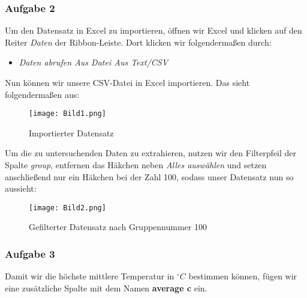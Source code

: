 \documentclass[a4paper, 12pt]{article}
\begin{document}
\subsubsection{Aufgabe 2}
Um den Datensatz in Excel zu importieren, öffnen wir Excel und klicken 
auf den Reiter \textit{Daten} der Ribbon-Leiste. Dort klicken wir folgendermaßen 
durch:

\vspace{\baselineskip} 

\begin{itemize}
   
 \item \textit{Daten abrufen \rightarrow Aus Datei \rightarrow Aus Text/CSV}
\end{itemize}

\vspace{\baselineskip} 

Nun können wir unsere CSV-Datei in Excel importieren. Das sieht folgendermaßen aus:

\vspace{\baselineskip}

\begin{figure}[ht]
    \centering
    \texttt{[image: Bild1.png]}
    \par Importierter Datensatz
\end{figure}

\vspace{\baselineskip}

Um die zu untersuchenden Daten zu extrahieren, nutzen wir den Filterpfeil der 
Spalte \textit{group}, entfernen das Häkchen neben \textit{Alles auswählen} und 
setzen anschließend nur ein Häkchen bei der Zahl 100, sodass unser Datensatz nun so 
aussieht:

\vspace{\baselineskip}

\begin{figure}[ht]
    \centering
    \texttt{[image: Bild2.png]}
    \par Gefilterter Datensatz nach Gruppennummer 100
\end{figure}

\newpage

\subsubsection{Aufgabe 3}
Damit wir die höchste mittlere Temperatur in  \(^\circ C\) bestimmen können, fügen wir eine zusätzliche Spalte mit dem Namen \textbf{average c} ein.
\end{document}
